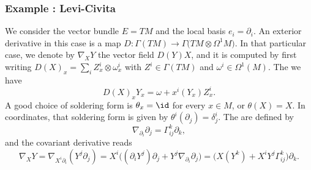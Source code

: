 \subsubsection{Example : Levi-Civita}

We consider the vector bundle $E=TM$ and the local basis $e_i=\partial_i$. An exterior derivative in this case is a map $D\colon \Gamma(TM)\to \Gamma\Big( TM\otimes\Omega^1M \Big)$. In that particular case, we denote by $\nabla_XY$ the vector field $D(Y)X$, and it is computed by first writing $D(X)_x=\sum_iZ_x^i\otimes\omega_x^i$ with $Z^i\in\Gamma(TM)$ and $\omega^i\in\Omega^1(M)$. The we have
\begin{equation}
D(X)_xY_x=\omega+x^i(Y_x)Z_x^i.
\end{equation}
A good choice of soldering form is $\theta_x=\id$ for every $x\in M$, or $\theta(X)=X$. In coordinates, that soldering form is given by $\theta^i(\partial_j)=\delta^i_j$. The  are defined by
\begin{equation}
\nabla_{\partial_i}\partial_j=\Gamma_{ij}^k\partial_k,
\end{equation}
and the covariant derivative reads
\begin{equation}		\label{EqCovDerGamChr}
\nabla_XY	= \nabla_{X^i\partial_i}(Y^j\partial_j)
		= X^i\Big( (\partial_iY^j)\partial_j+Y^j\nabla_{\partial_i}\partial_j \Big)
		= \Big( X(Y^k)+X^iY^j\Gamma_{ij}^k \Big) \partial_k.
\end{equation}

